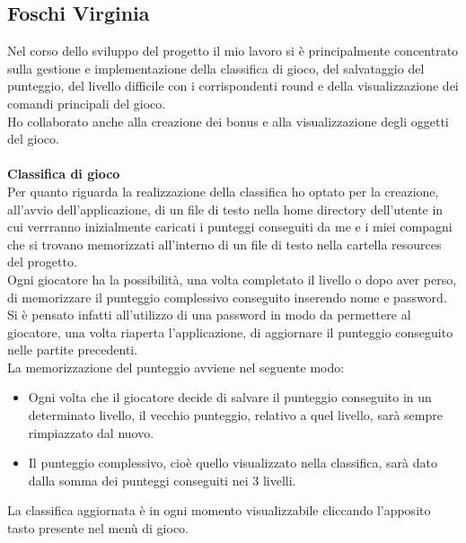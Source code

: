 \documentclass[a4paper,12pt]{report}
\begin{document}
\subsection{Foschi Virginia}
Nel corso dello sviluppo del progetto il mio lavoro si è principalmente concentrato sulla gestione e implementazione della classifica di gioco, del salvataggio del punteggio, del livello difficile con i corrispondenti round e della visualizzazione dei comandi principali del gioco.\\
Ho collaborato anche alla creazione dei bonus e alla visualizzazione degli oggetti del gioco.\\\\
\textbf{Classifica di gioco}\\
Per quanto riguarda la realizzazione della classifica ho optato per la creazione, all'avvio dell'applicazione, di un file di testo nella home directory dell'utente in cui verrranno inizialmente caricati i punteggi conseguiti da me e i miei compagni che si trovano memorizzati all'interno di un file di testo nella cartella resources del progetto.
\\Ogni giocatore ha la possibilità, una volta completato il livello o dopo aver perso, di memorizzare il punteggio complessivo conseguito inserendo nome e password. Si è pensato infatti all'utilizzo di una password in modo da permettere al giocatore, una volta riaperta l'applicazione, di aggiornare il punteggio conseguito nelle partite precedenti.
\\La memorizzazione del punteggio avviene nel seguente modo:
\begin{itemize}
    \item Ogni volta che il giocatore decide di salvare il punteggio conseguito in un determinato livello, il vecchio punteggio, relativo a quel livello, sarà sempre rimpiazzato dal nuovo.
    \item Il punteggio complessivo, cioè quello visualizzato nella classifica, sarà dato dalla somma dei punteggi conseguiti nei 3 livelli.
\end{itemize}
La classifica aggiornata è in ogni momento visualizzabile cliccando l'apposito tasto presente nel menù di gioco.\\\\
\end{document}
